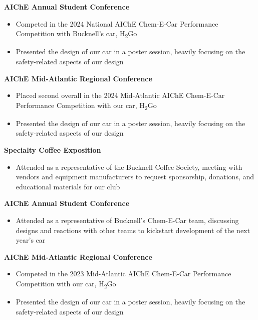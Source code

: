 \documentclass{article}
\begin{document}
\textbf{AIChE Annual Student Conference}  \hfill {}
\begin{itemize}[noitemsep,topsep=2pt]
    \item Competed in the 2024 National AIChE Chem-E-Car Performance Competition with Bucknell's car, H\textsubscript{2}Go
    \item Presented the design of our car in a poster session, heavily focusing on the safety-related aspects of our design
\end{itemize}

\textbf{AIChE Mid-Atlantic Regional Conference}  \hfill {}
\begin{itemize}[noitemsep,topsep=2pt]
    \item Placed second overall in the 2024 Mid-Atlantic AIChE Chem-E-Car Performance Competition with our car, H\textsubscript{2}Go
    \item Presented the design of our car in a poster session, heavily focusing on the safety-related aspects of our design
\end{itemize}

\textbf{Specialty Coffee Exposition}  \hfill {}
\begin{itemize}[noitemsep,topsep=2pt]
    \item Attended as a representative of the Bucknell Coffee Society, meeting with vendors and equipment manufacturers to request sponsorship, donations, and educational materials for our club
\end{itemize}

\textbf{AIChE Annual Student Conference}  \hfill {}
\begin{itemize}[noitemsep,topsep=2pt]
    \item Attended as a representative of Bucknell's Chem-E-Car team, discussing designs and reactions with other teams to kickstart development of the next year's car
\end{itemize}

\textbf{AIChE Mid-Atlantic Regional Conference}  \hfill {}
\begin{itemize}[noitemsep,topsep=2pt]
    \item Competed in the 2023 Mid-Atlantic AIChE Chem-E-Car Performance Competition with our car, H\textsubscript{2}Go
    \item Presented the design of our car in a poster session, heavily focusing on the safety-related aspects of our design
\end{itemize}




\end{document}
